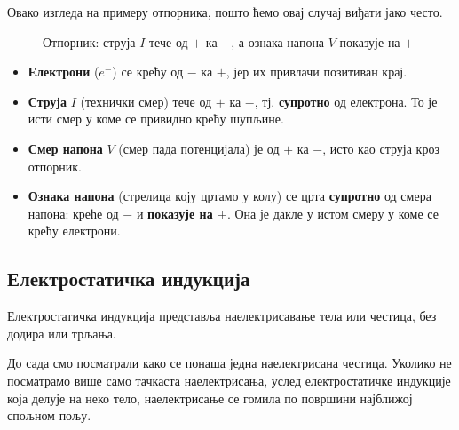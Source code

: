 \documentclass{article}
\begin{document}
Овако изгледа на примеру отпорника, пошто ћемо овај случај виђати јако често.

\begin{figure}[H]
    \centering
    \caption{Отпорник: струја $I$ тече од $+$ ка $-$, а ознака напона $V$ показује на $+$}
    \label{fig:otpornik-napon}
\end{figure}

\begin{tcolorbox}[colback=blue!5, colframe=blue!60, title=ВАЖНО ЗА ЗАПАМТИТИ]
\begin{itemize}
    \item \textbf{Електрони} ($e^-$) се крећу од $-$ ка $+$, јер их привлачи позитиван крај.
    \item \textbf{Струја} $I$ (технички смер) тече од $+$ ка $-$, тј. \textbf{супротно} од електрона. То је исти смер у коме се привидно крећу шупљине.
    \item \textbf{Смер напона} $V$ (смер пада потенцијала) је од $+$ ка $-$, исто као струја кроз отпорник.
    \item \textbf{Ознака напона} (стрелица коју цртамо у колу) се црта \textbf{супротно} од смера напона: креће од $-$ и \textbf{показује на $+$}. Она је дакле у истом смеру у коме се крећу електрони.
\end{itemize}
\end{tcolorbox}

\subsection{Електростатичка индукција}

Електростатичка индукција представља наелектрисавање тела или честица, без додира или трљања.

До сада смо посматрали како се понаша једна наелектрисана честица. 
Уколико не посматрамо више само тачкаста наелектрисања, услед електростатичке индукције која делује на неко тело, наелектрисање се гомила по површини најближој спољном пољу.
\end{document}
